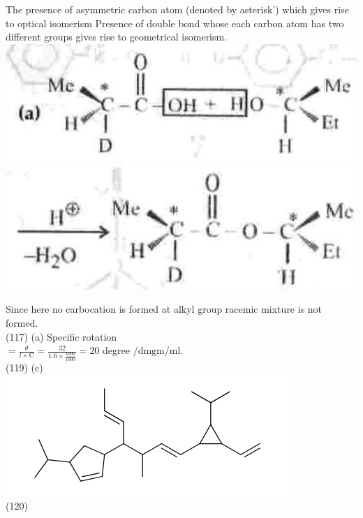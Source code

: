 \documentclass[10pt]{article}
\begin{document}
The presence of asymmetric carbon atom (denoted by asterisk') which gives rise to optical isomerism Presence of double bond whose each carbon atom has two different groups gives rise to geometrical isomerism.\\
\includegraphics[max width=\textwidth, center]{2025_01_28_8470952b98110cec3aabg-161(3)}\\
\includegraphics[max width=\textwidth, center]{2025_01_28_8470952b98110cec3aabg-161}

Since here no carbocation is formed at alkyl group racemic mixture is not formed.\\
(117) (a) Specific rotation\\
$=\frac{\theta}{l \times \mathrm{C}}=\frac{32}{1.6 \times \frac{1000}{1000}}=20$ degree $/ \mathrm{dm} \mathrm{gm} / \mathrm{ml}$.\\
(119) (c)\\
\includegraphics{smile-2071e49db642776ee5443245e1827852d1b61fa9}\\
(120)\\
\end{document}
